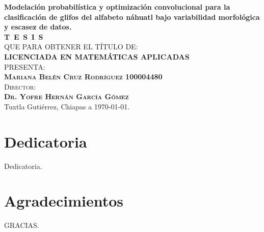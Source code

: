 \begin{titlepage}
\begin{minipage}[t][0.95\textheight][c]{0.76\textwidth}
            \begin{center}
                \vspace{0.7cm}
                {\Large\bfseries Modelación probabilística y optimización convolucional para la clasificación de glifos del alfabeto náhuatl bajo variabilidad morfológica y escasez de datos.}\\[2cm]
                \textsc{\huge \textbf{T\, E\, S\, I\, S}}\\[1.5cm]
                \textsc{\large QUE PARA OBTENER EL TÍTULO DE:}\\[0.3cm]
                \textbf{\textsc{LICENCIADA EN MATEMÁTICAS APLICADAS}}\\[1.5cm]
                \textsc{\large PRESENTA:}\\[0.3cm]
                \textbf{\textsc{\large {Mariana Belén Cruz Rodríguez 100004480}}}\\[2cm]
                {\large\scshape Director:\\[0.3cm]
                {\textbf{\large Dr. Yofre Hernán García Gómez }}}\\[2.0cm]
                \large{Tuxtla Gutiérrez, Chiapas a \today.}

            \end{center}
\end{minipage}
\end{titlepage}

\pagebreak[2]

\chapter*{Dedicatoria}
\begin{flushright}
\itshape
\setlength{\parindent}{0pt} %
\setlength{\parskip}{1.2\baselineskip} %

Dedicatoria.
\end{flushright}


\chapter*{Agradecimientos}

GRACIAS.